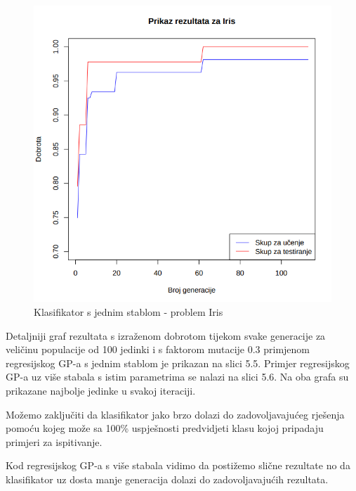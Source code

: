 \documentclass[times, utf8, zavrsni]{fer}
\begin{document}
\begin{figure}[htb]
\centering
\includegraphics[scale=0.45]{grafovi/iris1}
\caption{Klasifikator s jednim stablom - problem Iris}
\end{figure}


Detaljniji graf rezultata s izraženom dobrotom tijekom svake generacije za veličinu populacije od 100 jedinki i s faktorom mutacije 0.3 primjenom regresijskog GP-a s jednim stablom je prikazan na slici 5.5. Primjer regresijskog GP-a uz više stabala s istim parametrima se nalazi na slici 5.6. Na oba grafa su prikazane najbolje jedinke u svakoj iteraciji.

Možemo zaključiti da klasifikator jako brzo dolazi do zadovoljavajućeg rješenja pomoću kojeg može sa 100\% uspješnosti predvidjeti klasu kojoj pripadaju primjeri za ispitivanje.

Kod regresijskog GP-a s više stabala vidimo da postižemo slične rezultate no da klasifikator uz dosta manje generacija dolazi do zadovoljavajućih rezultata.
 
\end{document}
